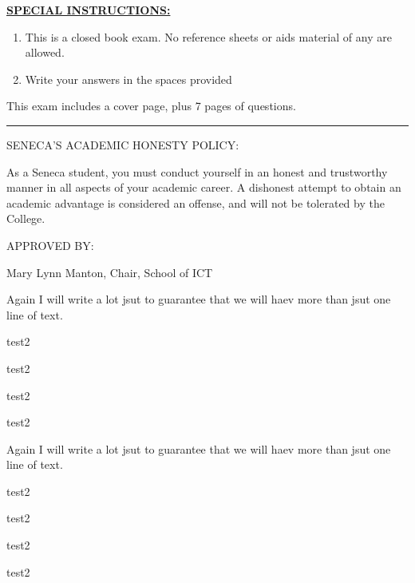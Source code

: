 \documentclass{seneca_final}
\begin{document}
\noindent
\textbf{\underline{\MakeUppercase{special instructions:}}}

\begin{enumerate}
   \item This is a closed book exam. No reference sheets or aids material of any are allowed.
   \item Write your answers in the spaces provided
\end{enumerate}

\noindent
This exam includes a cover page, plus 7 pages of questions.
\vspace{0.15cm}
\hrule

\vspace{0.5cm}
\noindent
\MakeUppercase{Seneca's academic honesty policy:}

\noindent
As a Seneca student, you must conduct yourself in an honest and trustworthy manner in all aspects of your academic career. A dishonest attempt to obtain an academic advantage is considered an offense, and will not be tolerated by the College.

\vspace{0.5cm}
\noindent
\MakeUppercase{Approved by:}

\noindent
Mary Lynn Manton, Chair, School of ICT

\newpage


   \begin{multiple_choice}
      \item Again I will write a lot jsut to guarantee that we will haev more than jsut one line of text.
      \item test2
      \item test2
      \item test2
      \item test2
   \end{multiple_choice}

   \begin{true_false}
      \item Again I will write a lot jsut to guarantee that we will haev more than jsut one line of text.
      \item test2
      \item test2
      \item test2
      \item test2
   \end{true_false}
\end{document}
